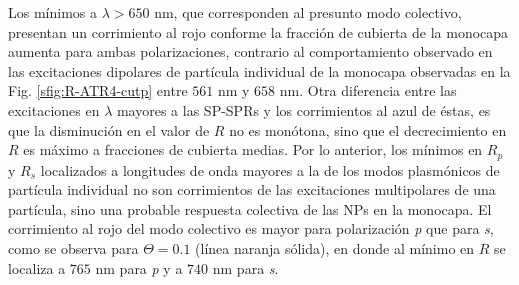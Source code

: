 Los mínimos a $\lambda>650$ nm, que corresponden al presunto modo colectivo, presentan un corrimiento al rojo conforme la fracción de cubierta de la monocapa aumenta  para ambas polarizaciones, contrario al comportamiento observado en las excitaciones dipolares de partícula individual de la monocapa observadas en la Fig. \ref{sfig:R-ATR4-cutp} entre $561$ nm y $658$ nm. Otra diferencia entre las excitaciones en $\lambda$ mayores a las SP-SPRs y los corrimientos al azul de éstas, es que la disminución en el valor de $R$ no es monótona, sino que el decrecimiento en $R$ es máximo a fracciones de cubierta medias. Por lo anterior, los mínimos en $R_p$ y $R_s$ localizados a longitudes de onda mayores a la de los modos plasmónicos de partícula individual no son corrimientos de las excitaciones multipolares de una partícula, sino una probable respuesta colectiva de las NPs en la monocapa. El corrimiento al rojo del modo colectivo es mayor para  polarización \emph{p} que para \emph{s}, como se observa para $\Theta=0.1$ (línea naranja sólida), en donde al mínimo en $R$ se localiza a $765$ nm para \emph{p} y  a $740$ nm para \emph{s}.


